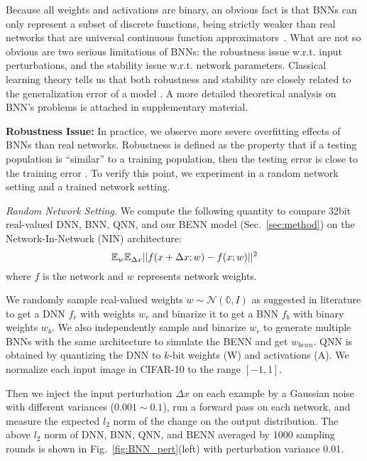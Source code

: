\documentclass[10pt,twocolumn,letterpaper]{article}
\begin{document}
Because all weights and activations are binary, an obvious fact is that BNNs can only represent a subset of discrete functions, being strictly weaker than real networks that are universal continuous function approximators~\cite{hornik1989multilayer}. What are not so obvious are two serious limitations of BNNs: the robustness issue w.r.t. input perturbations, and the stability issue w.r.t. network parameters. Classical learning theory tells us that both robustness and stability are closely related to the generalization error of a model \cite{xu2012robustness, bousquet2002stability}. A more detailed theoretical analysis on BNN's problems is attached in supplementary material.

\textbf{Robustness Issue:} In practice, we observe more severe overfitting effects of BNNs than real networks. %
Robustness is defined as the property that if a testing population is ``similar'' to a training population, then the testing error is close to the training error \cite{xu2012robustness}. To verify this point, we experiment in a random network setting and a trained network setting.

\emph{Random Network Setting.} We compute the following quantity to compare 32bit real-valued DNN, BNN, QNN, and our BENN model (Sec.~\ref{sec:method}) on the Network-In-Network (NIN) architecture:
\vspace{-1mm}
\begin{equation} \label{eq:1}
    \mathbb E_{w}\mathbb E_{\Delta x}||f(x+\Delta x;w)-f(x;w)||^{2}
    \vspace{-1mm}
\end{equation}
where $f$ is the network and $w$ represents network weights. 

We randomly sample real-valued weights $w\sim \mathcal{N}(\mathbb{0}, I)$ as suggested in literature to get a DNN $f_r$ with weights $w_r$ and binarize it to get a BNN $f_b$ with binary weights $w_{b}$. We also independently sample and binarize $w_r$ to generate multiple BNNs with the same architecture to simulate the BENN and get $w_{benn}$. QNN is obtained by quantizing the DNN to $k$-bit weights (W) and activations (A). We normalize each input image in CIFAR-10 to the range $[-1,1]$. 

Then we inject the input perturbation $\Delta x$ on each example by a Gaussian noise with different variances ($0.001 \sim 0.1$), run a forward pass on each network, and measure the expected $l_{2}$ norm of the change on the output distribution.
The above $l_{2}$ norm of DNN, BNN, QNN, and BENN averaged by 1000 sampling rounds is shown in Fig.~\ref{fig:BNN_pert}(left) with perturbation variance 0.01. 
\end{document}
